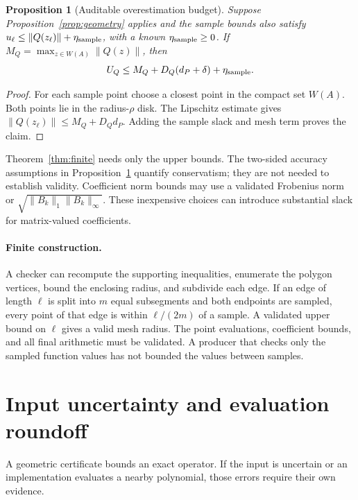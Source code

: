 \documentclass[11pt]{article}
\newcommand{\norm}[1]{\lVert #1\rVert}
\newcommand{\W}{W}
\newtheorem{proposition}[theorem]{Proposition}
\theoremstyle{definition}
\theoremstyle{remark}
\numberwithin{equation}{section}
\begin{document}
\begin{proposition}[Auditable overestimation budget]\label{prop:excess}
Suppose Proposition~\ref{prop:geometry} applies and the sample bounds
also satisfy
\(u_\ell\le\norm{Q(z_\ell)}+\eta_{\rm sample}\), with a known
\(\eta_{\rm sample}\ge0\).
If \(M_Q=\max_{z\in\W(A)}\norm{Q(z)}\), then
\begin{equation}\label{eq:budget}
 U_Q\le M_Q+D_Q(d_P+\delta)+\eta_{\rm sample}.
\end{equation}
\end{proposition}
\begin{proof}
For each sample point choose a closest point in the compact set
\(\W(A)\).
Both points lie in the radius-\(\rho\) disk.
The Lipschitz estimate gives
\(\norm{Q(z_\ell)}\le M_Q+D_Qd_P\).
Adding the sample slack and mesh term proves the claim.
\end{proof}

Theorem~\ref{thm:finite} needs only the upper bounds.
The two-sided accuracy assumptions in Proposition~\ref{prop:excess}
quantify conservatism; they are not needed to establish validity.
Coefficient norm bounds may use a validated Frobenius norm or
\(\sqrt{\norm{B_k}_1\norm{B_k}_\infty}\).
These inexpensive choices can introduce substantial slack for
matrix-valued coefficients.

\paragraph{Finite construction.}
A checker can recompute the supporting inequalities, enumerate the polygon
vertices, bound the enclosing radius, and subdivide each edge.
If an edge of length \(\ell\) is split into \(m\) equal subsegments
and both endpoints are sampled, every point of that edge is within
\(\ell/(2m)\) of a sample.
A validated upper bound on \(\ell\) gives a valid mesh radius.
The point evaluations, coefficient bounds, and all final arithmetic must
be validated.
A producer that checks only the sampled function values has not bounded
the values between samples.

\section{Input uncertainty and evaluation roundoff}\label{sec:errors}
A geometric certificate bounds an exact operator.
If the input is uncertain or an implementation evaluates a nearby
polynomial, those errors require their own evidence.
\end{document}
